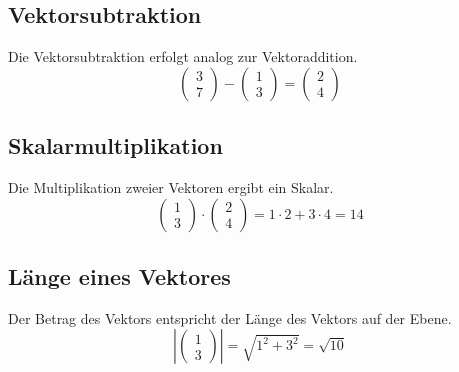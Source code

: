 \documentclass[12pt,a4paper]{scrbook}
\begin{document}
\subsection{Vektorsubtraktion}
Die Vektorsubtraktion erfolgt analog zur Vektoraddition.
\[ \left(\begin{array}{c}3\\7\end{array}\right) - \left(\begin{array}{c}1\\3\end{array}\right) = \left(\begin{array}{c}2\\4\end{array}\right) \]

\subsection{Skalarmultiplikation}
Die Multiplikation zweier Vektoren ergibt ein Skalar.
\[ \left(\begin{array}{c}1\\3\end{array}\right) \cdot \left(\begin{array}{c}2\\4\end{array}\right) = 1 \cdot 2 + 3 \cdot 4 =  14\]

\subsection{Länge eines Vektores}
Der Betrag des Vektors entspricht der Länge des Vektors auf der Ebene.
\[ \left\vert\left(\begin{array}{c}1\\3\end{array}\right)\right\vert = \sqrt{1^2 + 3^2} = \sqrt{10}\]
\end{document}
